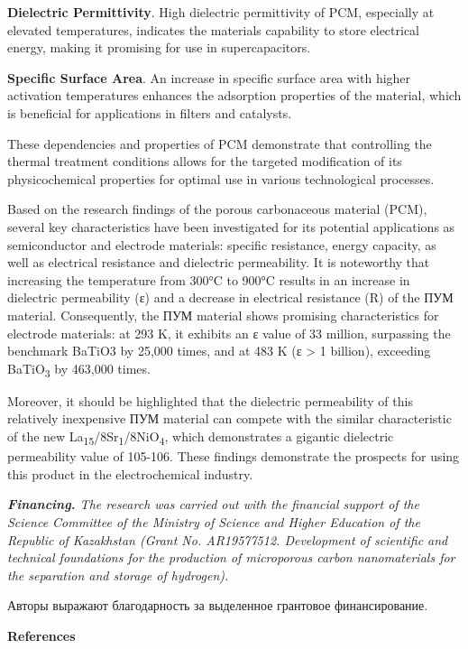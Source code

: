 \textbf{Dielectric Permittivity}. High dielectric permittivity of PCM,
especially at elevated temperatures, indicates the
material\textquotesingle s capability to store electrical energy, making
it promising for use in supercapacitors.

\textbf{Specific Surface Area}. An increase in specific surface area
with higher activation temperatures enhances the adsorption properties
of the material, which is beneficial for applications in filters and
catalysts.

These dependencies and properties of PCM demonstrate that controlling
the thermal treatment conditions allows for the targeted modification of
its physicochemical properties for optimal use in various technological
processes.

Based on the research findings of the porous carbonaceous material
(PCM), several key characteristics have been investigated for its
potential applications as semiconductor and electrode materials:
specific resistance, energy capacity, as well as electrical resistance
and dielectric permeability. It is noteworthy that increasing the
temperature from 300°C to 900°C results in an increase in dielectric
permeability (ε) and a decrease in electrical resistance (R) of the ПУМ
material. Consequently, the ПУМ material shows promising characteristics
for electrode materials: at 293 K, it exhibits an ε value of 33 million,
surpassing the benchmark BaTiO3 by 25,000 times, and at 483 K (ε
\textgreater{} 1 billion), exceeding BaTiO\textsubscript{3} by 463,000
times.

Moreover, it should be highlighted that the dielectric permeability of
this relatively inexpensive ПУМ material can compete with the similar
characteristic of the new
La\textsubscript{15}/8Sr\textsubscript{1}/8NiO\textsubscript{4}, which
demonstrates a gigantic dielectric permeability value of 105-106. These
findings demonstrate the prospects for using this product in the
electrochemical industry.

\emph{\textbf{Financing.} The research was carried out with the
financial support of the Science Committee of the Ministry of Science
and Higher Education of the Republic of Kazakhstan (Grant No.
AR19577512. Development of scientific and technical foundations for the
production of microporous carbon nanomaterials for the separation and
storage of hydrogen).}

Авторы выражают благодарность за выделенное грантовое финансирование.

\textbf{References}

